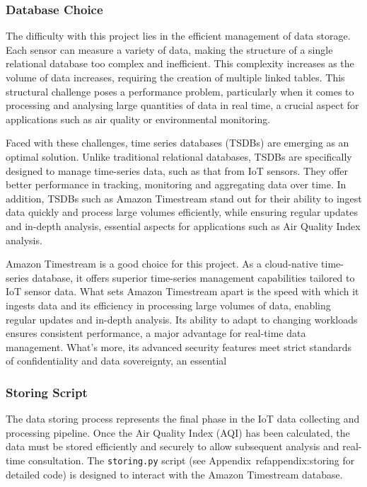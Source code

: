 \documentclass[12pt,oneside]{book} %
\begin{document}
\subsubsection{Database Choice}
The difficulty with this project lies in the efficient management of data
storage. Each sensor can measure a variety of data, making the structure of a
single relational database too complex and inefficient. This complexity
increases as the volume of data increases, requiring the creation of multiple
linked tables. This structural challenge poses a performance problem,
particularly when it comes to processing and analysing large quantities of data
in real time, a crucial aspect for applications such as air quality or
environmental monitoring.

Faced with these challenges, time series databases (TSDBs) are emerging as an
optimal solution. Unlike traditional relational databases, TSDBs are
specifically designed to manage time-series data, such as that from IoT
sensors. They offer better performance in tracking, monitoring and aggregating
data over time. In addition, TSDBs such as Amazon Timestream stand out for
their ability to ingest data quickly and process large volumes efficiently,
while ensuring regular updates and in-depth analysis, essential aspects for
applications such as Air Quality Index analysis.

Amazon Timestream is a good choice for this project. As a cloud-native
time-series database, it offers superior time-series management capabilities
tailored to IoT sensor data. What sets Amazon Timestream apart is the speed
with which it ingests data and its efficiency in processing large volumes of
data, enabling regular updates and in-depth analysis. Its ability to adapt to
changing workloads ensures consistent performance, a major advantage for
real-time data management. What's more, its advanced security features meet
strict standards of confidentiality and data sovereignty, an essential

\subsubsection{Storing Script}
The data storing process represents the final phase in the IoT data collecting
and processing pipeline. Once the Air Quality Index (AQI) has been calculated,
the data must be stored efficiently and securely to allow subsequent analysis
and real-time consultation. The \texttt{storing.py} script (see
Appendix~ref{appendix:storing} for detailed code) is designed to interact with
the Amazon Timestream database.
\end{document}
